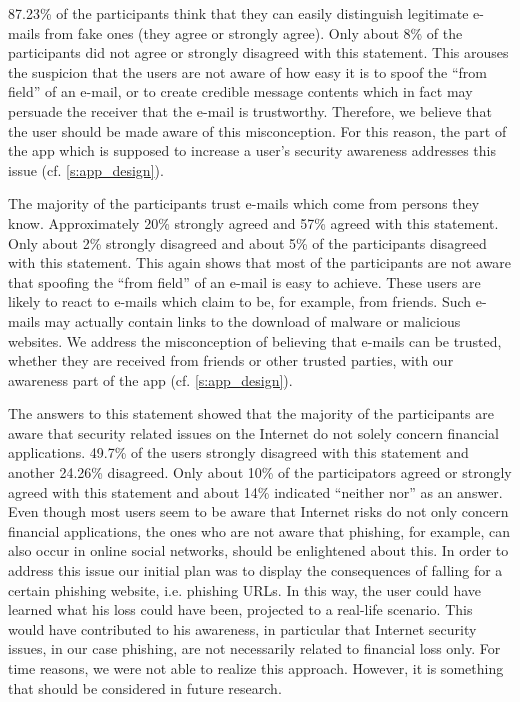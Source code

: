 \begin{description}[leftmargin=0cm]
	\item[Self-Assessment - Distinguish legitimate from illegitimate e-mails:] 87.23\% of the participants think that they can easily distinguish legitimate e-mails from fake ones (they agree or strongly agree).
 Only about 8\% of the participants did not agree or strongly disagreed with this statement.
 This arouses the suspicion that the users are not aware of how easy it is to spoof the ``from field'' of an e-mail, or to create credible message contents which in fact may persuade the receiver that the e-mail is trustworthy.
Therefore, we believe that the user should be made aware of this misconception.
For this reason, the part of the app which is supposed to increase a user's security awareness addresses this issue (cf. \autoref{s:app_design}).
	
	\item[Self-Assessment - Trust in e-mails from known parties:] The majority of the participants trust e-mails which come from persons they know.
 Approximately 20\% strongly agreed and 57\% agreed with this statement.
 Only about 2\% strongly disagreed and about 5\% of the participants disagreed with this statement.
 This again shows that most of the participants are not aware that spoofing the ``from field'' of an e-mail is easy to achieve.
 These users are likely to react to e-mails which claim to be, for example, from friends.
 Such e-mails may actually contain links to the download of malware or malicious websites.
We address the misconception of believing that e-mails can be trusted, whether they are received from friends or other trusted parties, with our awareness part of the app (cf. \autoref{s:app_design}).


	\item[Self-Assessment - Internet security is only related to financial applications:] The answers to this statement showed that the majority of the participants are aware that security related issues on the Internet do not solely concern financial applications.
 49.7\% of the users strongly disagreed with this statement and another 24.26\% disagreed.
 Only about 10\% of the participators agreed or strongly agreed with this statement and about 14\% indicated ``neither nor'' as an answer.
 Even though most users seem to be aware that Internet risks do not only concern financial applications, the ones who are not aware that phishing, for example, can also occur in online social networks, should be enlightened about this.
 In order to address this issue our initial plan was to display the consequences of falling for a certain phishing website, i.e. phishing URLs. In this way, the user could have learned what his loss could have been, projected to a real-life scenario.
 This would have contributed to his awareness, in particular that Internet security issues, in our case phishing, are not necessarily related to financial loss only.
 For time reasons, we were not able to realize this approach. However, it is something that should be considered in future research.



\end{description}

